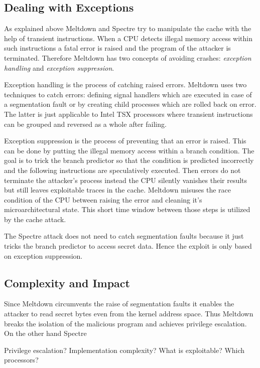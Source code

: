 \documentclass[a4paper,oneside,openright] {scrreprt}
\begin{document}
\subsection{Dealing with Exceptions}
\label{ch:intro:motivation:A}

As explained above Meltdown and Spectre try to manipulate the cache with the help of transient instructions. 
When a CPU detects illegal memory access within such instructions a fatal error is raised and the program of the attacker
is terminated. Therefore Meltdown has two concepts of avoiding crashes: \textit{exception handling} and \textit{exception suppression}.

Exception handling is the process of catching raised errors. Meltdown uses two techniques to catch errors: defining signal handlers
which are executed in case of a segmentation fault or by creating child processes which are rolled back on error.
The latter is just applicable to Intel TSX processors where transient instructions can be grouped and reversed as a whole after failing.

Exception suppression is the process of preventing that an error is raised. This can be done by putting the illegal memory access
within a branch condition. The goal is to trick the branch predictor so that the condition is predicted incorrectly and the following
instructions are speculatively executed.
Then errors do not terminate the attacker's process instead the CPU silently vanishes their results
 but still leaves exploitable traces in the cache.
Meltdown misuses the race condition of the CPU between raising the error and cleaning it's microarchitectural state. 
This short time window between those steps is utilized by the cache attack.

The Spectre attack does not need to catch segmentation faults because it just tricks the branch predictor to access secret data. 
Hence the exploit is only based on exception suppression.

\subsection{Complexity and Impact}
\label{ch:intro:motivation:A}

Since Meltdown circumvents the raise of segmentation faults it enables the attacker to read secret bytes even from the kernel address space.
Thus Meltdown breaks the isolation of the malicious program and achieves privilege escalation. 
On the other hand Spectre 


Privilege escalation?
Implementation complexity?
What is exploitable?
Which processors?
\end{document}
